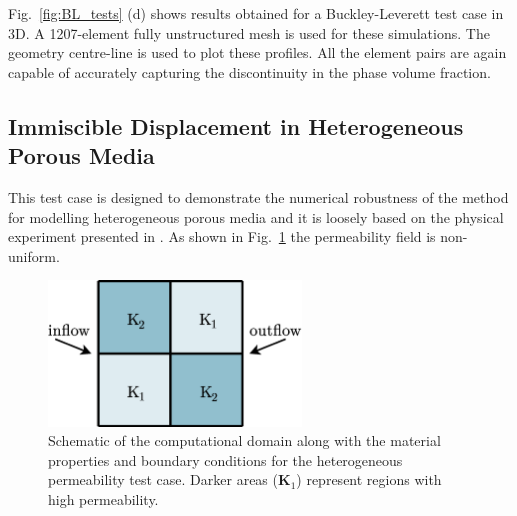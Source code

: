 \documentclass[preprint,authoryear,12pt]{elsarticle}
\begin{document}
Fig.~\ref{fig:BL_tests} (d) shows results obtained for a
Buckley-Leverett test case in 3D. A 1207-element fully unstructured
mesh is used for these simulations. The geometry centre-line is used
to plot these profiles. All the element pairs are again capable of
accurately capturing the discontinuity in the phase volume fraction.


\subsection{Immiscible Displacement in Heterogeneous Porous Media}\label{res2}

This test case is designed to demonstrate the numerical robustness of
the method for modelling heterogeneous porous media and it is loosely
based on the physical experiment presented in \cite{dawe_2008}. As
shown in Fig.~\ref{fig:4reg_BL_schematic} the permeability field is
non-uniform.

\begin{figure}[h!]
  \begin{center}
    \includegraphics[width=0.6\textwidth]{4Rregion_BLv2}
    \caption{Schematic of the computational domain along with the
      material properties and boundary conditions for the
      heterogeneous permeability test case. Darker areas
      ($\mathbf{K}_\text{1}$) represent regions with high
      permeability. \label{fig:4reg_BL_schematic}}
  \end{center}
\end{figure}
\end{document}
